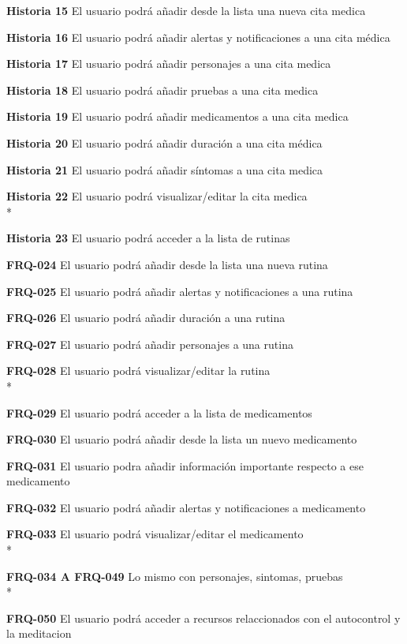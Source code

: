 \documentclass[../pfc.tex]{subfiles}
\begin{document}
	\textbf{Historia 15}	El usuario podrá añadir desde la lista una nueva cita medica
	
	\textbf{Historia 16}	El usuario podrá añadir alertas y notificaciones a una cita médica
	
	\textbf{Historia 17}	El usuario podrá añadir personajes a una cita medica
	
	\textbf{Historia 18}	El usuario podrá añadir pruebas a una cita medica
	
	\textbf{Historia 19}	El usuario podrá añadir medicamentos a una cita medica
	
	\textbf{Historia 20}	El usuario podrá añadir duración a una cita médica
	
	\textbf{Historia 21}	El usuario podrá añadir síntomas a una cita medica
	
	\textbf{Historia 22}	El usuario podrá visualizar/editar la cita medica\\*
	
	\textbf{Historia 23}	El usuario podrá acceder a la lista de rutinas
	
	\textbf{FRQ-024}	El usuario podrá añadir desde la lista una nueva rutina
	
	\textbf{FRQ-025}	El usuario podrá añadir alertas y notificaciones a una rutina
	
	\textbf{FRQ-026}	El usuario podrá añadir duración a una rutina
	
	\textbf{FRQ-027}	El usuario podrá añadir personajes a una rutina
	
	\textbf{FRQ-028}	El usuario podrá visualizar/editar la rutina\\*
	
	\textbf{FRQ-029}	El usuario podrá acceder a la lista de medicamentos
	
	\textbf{FRQ-030}	El usuario podrá añadir desde la lista un nuevo medicamento
	
	\textbf{FRQ-031}	El usuario podra añadir información importante respecto a ese medicamento
	
	\textbf{FRQ-032}	El usuario podrá añadir alertas y notificaciones a medicamento
	
	\textbf{FRQ-033}	El usuario podrá visualizar/editar el medicamento\\*
	
	\textbf{FRQ-034 A FRQ-049}	Lo mismo con personajes, sintomas, pruebas\\*
	
	\textbf{FRQ-050}	El usuario podrá acceder a recursos relaccionados con el autocontrol y la meditacion
	
\end{document}
